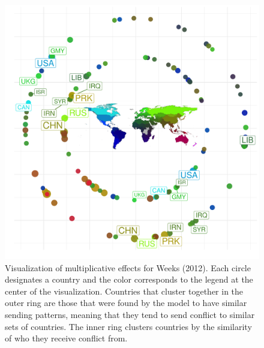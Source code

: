 \begin{figure}[!h]
	\includegraphics[width=\textwidth]{weeks_circPlot.pdf}
	\caption{\label{fig:weekscirc} Visualization of multiplicative effects for Weeks (2012). Each circle designates a country and the color corresponds to the legend at the center of the visualization. Countries that cluster together in the outer ring are those that were found by the model to have similar sending patterns, meaning that they tend to send conflict to similar sets of countries. The inner ring clusters countries by the similarity of who they receive conflict from. 
	}
\end{figure}
\FloatBarrier

